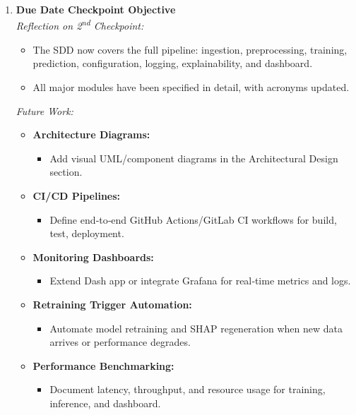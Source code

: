 \documentclass[12pt]{article}
\begin{document}
\begin{enumerate}[label=\textbf{\arabic*.}]
  \item \textbf{Due Date Checkpoint Objective}\\
    \emph{Reflection on 2\textsuperscript{nd} Checkpoint:}  
    \begin{itemize}
      \item The SDD now covers the full pipeline: ingestion, preprocessing, training, prediction, configuration, logging, explainability, and dashboard.
      \item All major modules have been specified in detail, with acronyms updated.
    \end{itemize}
    \emph{Future Work:}
    \begin{itemize}
      \item \textbf{Architecture Diagrams:}  
        \begin{itemize}
          \item Add visual UML/component diagrams in the Architectural Design section.
        \end{itemize}
      \item \textbf{CI/CD Pipelines:}  
        \begin{itemize}
          \item Define end‐to‐end GitHub Actions/GitLab CI workflows for build, test, deployment.
        \end{itemize}
      \item \textbf{Monitoring Dashboards:}  
        \begin{itemize}
          \item Extend Dash app or integrate Grafana for real‐time metrics and logs.
        \end{itemize}
      \item \textbf{Retraining Trigger Automation:}  
        \begin{itemize}
          \item Automate model retraining and SHAP regeneration when new data arrives or performance degrades.
        \end{itemize}
      \item \textbf{Performance Benchmarking:}  
        \begin{itemize}
          \item Document latency, throughput, and resource usage for training, inference, and dashboard.
        \end{itemize}
    \end{itemize}

\end{enumerate}
\end{document}
